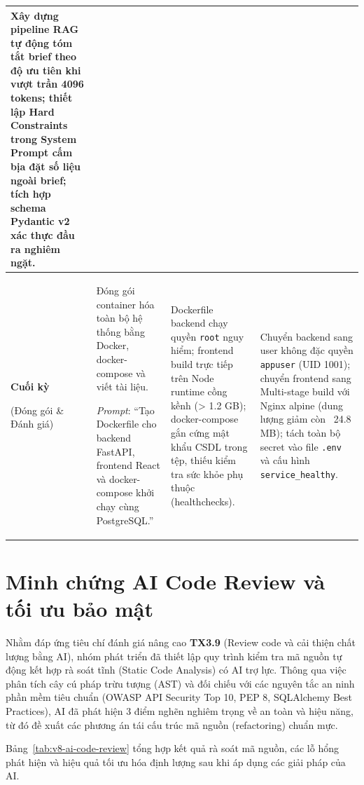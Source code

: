 \begin{table}[!htbp]
\begin{tabularx}{\textwidth}{|C{1.8cm}|L{3.2cm}|Y|Y|}
Xây dựng pipeline RAG tự động tóm tắt brief theo độ ưu tiên khi vượt trần 4096 tokens; thiết lập Hard Constraints trong System Prompt cấm bịa đặt số liệu ngoài brief; tích hợp schema Pydantic v2 xác thực đầu ra nghiêm ngặt. \\
\hline
\textbf{Cuối kỳ}\par (Đóng gói \& Đánh giá) &
Đóng gói container hóa toàn bộ hệ thống bằng Docker, docker-compose và viết tài liệu.\par
\textit{Prompt}: ``Tạo Dockerfile cho backend FastAPI, frontend React và docker-\allowbreak compose khởi chạy cùng PostgreSQL.'' &
Dockerfile backend chạy quyền \texttt{root} nguy hiểm; frontend build trực tiếp trên Node runtime cồng kềnh (> 1.2 GB); docker-compose gắn cứng mật khẩu CSDL trong tệp, thiếu kiểm tra sức khỏe phụ thuộc (healthchecks). &
Chuyển backend sang user không đặc quyền \texttt{appuser} (UID 1001); chuyển frontend sang Multi-stage build với Nginx alpine (dung lượng giảm còn ~24.8 MB); tách toàn bộ secret vào file \texttt{.env} và cấu hình \texttt{service\_healthy}. \\
\hline
\end{tabularx}
\end{table}

\section{Minh chứng AI Code Review và tối ưu bảo mật}\label{sec:v8-ai-code-review}

Nhằm đáp ứng tiêu chí đánh giá nâng cao \textbf{TX3.9} (Review code và cải thiện chất lượng bằng AI), nhóm phát triển đã thiết lập quy trình kiểm tra mã nguồn tự động kết hợp rà soát tĩnh (Static Code Analysis) có AI trợ lực. Thông qua việc phân tích cây cú pháp trừu tượng (AST) và đối chiếu với các nguyên tắc an ninh phần mềm tiêu chuẩn (OWASP API Security Top 10, PEP 8, SQLAlchemy Best Practices), AI đã phát hiện 3 điểm nghẽn nghiêm trọng về an toàn và hiệu năng, từ đó đề xuất các phương án tái cấu trúc mã nguồn (refactoring) chuẩn mực.

Bảng~\ref{tab:v8-ai-code-review} tổng hợp kết quả rà soát mã nguồn, các lỗ hổng phát hiện và hiệu quả tối ưu hóa định lượng sau khi áp dụng các giải pháp của AI.

